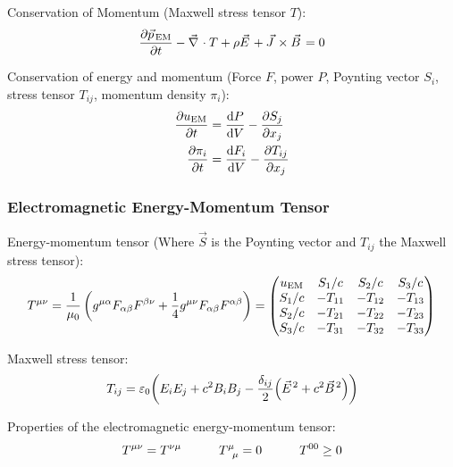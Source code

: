 			\noindent
			Conservation of Momentum (Maxwell stress tensor $T$):
			\begin{equation}
				\pdv{\vec{p}_{\text{EM}}}{t} - \Nabla\cdot T + \rho \vec{E} + \vec{J}\times\vec{B} = 0
			\end{equation}

			\noindent
			Conservation of energy and momentum (Force $F$, power $P$, Poynting vector $S_i$, stress tensor $T_{ij}$, momentum density $\pi_i$):
			\begin{equation}
				\begin{aligned}
					\pdv{u_{\text{EM}}}{t} &= \dv{P}{V} - \pdv{S_j}{x_j} \\
					\pdv{\pi_i}{t} &=	\dv{F_i}{V} - \pdv{T_{ij}}{x_j}
				\end{aligned}
			\end{equation}

		\subsubsection{Electromagnetic Energy-Momentum Tensor}
			\noindent
			Energy-momentum tensor (Where $\vec{S}$ is the Poynting vector and $T_{ij}$ the Maxwell stress tensor):
			\begin{equation}
				T^{\mu\nu} = \frac{1}{\mu_0}\left(g^{\mu\alpha} F_{\alpha\beta} F^{\beta\nu} +\frac{1}{4}g^{\mu\nu} F_{\alpha\beta} F^{\alpha\beta} \right)
				= \left( \begin{matrix}
						u_{\text{EM}} & S_1/c   & S_2/c   & S_3/c   \\
						S_1/c         & -T_{11} & -T_{12} & -T_{13} \\
						S_2/c         & -T_{21} & -T_{22} & -T_{23} \\
						S_3/c         & -T_{31} & -T_{32} & -T_{33}
					\end{matrix} \right) \\
			\end{equation}
			
			\noindent
			Maxwell stress tensor:
			\begin{equation}
				T_{ij} = \varepsilon_0 \qty( E_i E_j + c^2 B_i B_j - \frac{\delta_{ij}}{2}\qty(\vec{E}^2 + c^2 \vec{B}^2 ) )
			\end{equation}
			
			\noindent
			Properties of the electromagnetic energy-momentum tensor:
			\begin{equation}
				T^{\mu\nu} = T^{\nu\mu}
				\hspace{30pt}
				T^\mu_{\phantom{\mu}\mu} = 0
				\hspace{30pt}
				T^{00} \ge 0
			\end{equation}

